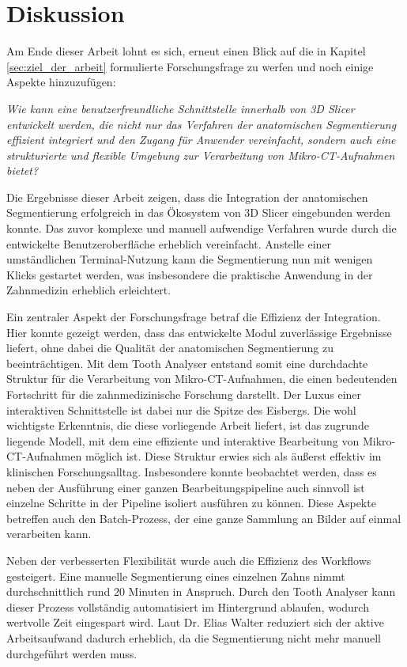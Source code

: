 \chapter{Diskussion}
\label{chap:diskussion} Am Ende dieser Arbeit lohnt es sich, erneut einen Blick
auf die in Kapitel \ref{sec:ziel_der_arbeit} formulierte Forschungsfrage zu
werfen und noch einige Aspekte hinzuzufügen:

\begin{center}
	\textit{Wie kann eine benutzerfreundliche Schnittstelle innerhalb von 3D
	Slicer entwickelt werden, die nicht nur das Verfahren der anatomischen Segmentierung
	effizient integriert und den Zugang für Anwender vereinfacht, sondern auch
	eine strukturierte und flexible Umgebung zur Verarbeitung von Mikro-\ac{CT}-Aufnahmen
	bietet?}
\end{center}

Die Ergebnisse dieser Arbeit zeigen, dass die Integration der anatomischen
Segmentierung erfolgreich in das Ökosystem von 3D Slicer eingebunden werden
konnte. Das zuvor komplexe und manuell aufwendige Verfahren wurde durch die entwickelte
Benutzeroberfläche erheblich vereinfacht. Anstelle einer umständlichen Terminal-Nutzung
kann die Segmentierung nun mit wenigen Klicks gestartet werden, was insbesondere
die praktische Anwendung in der Zahnmedizin erheblich erleichtert.

Ein zentraler Aspekt der Forschungsfrage betraf die Effizienz der Integration.
Hier konnte gezeigt werden, dass das entwickelte Modul zuverlässige Ergebnisse liefert,
ohne dabei die Qualität der anatomischen Segmentierung zu beeinträchtigen. Mit dem
Tooth Analyser entstand somit eine durchdachte Struktur für die Verarbeitung von
Mikro-\ac{CT}-Aufnahmen, die einen bedeutenden Fortschritt für die zahnmedizinische
Forschung darstellt. Der Luxus einer interaktiven Schnittstelle ist dabei nur
die Spitze des Eisbergs. Die wohl wichtigste Erkenntnis, die diese vorliegende
Arbeit liefert, ist das zugrunde liegende Modell, mit dem eine effiziente und
interaktive Bearbeitung von Mikro-CT-Aufnahmen möglich ist. Diese Struktur erwies
sich als äußerst effektiv im klinischen Forschungsalltag. Insbesondere konnte
beobachtet werden, dass es neben der Ausführung einer ganzen Bearbeitungspipeline
auch sinnvoll ist einzelne Schritte in der Pipeline isoliert ausführen zu können.
Diese Aspekte betreffen auch den Batch-Prozess, der eine ganze Sammlung an Bilder
auf einmal verarbeiten kann.

Neben der verbesserten Flexibilität wurde auch die Effizienz des Workflows gesteigert.
Eine manuelle Segmentierung eines einzelnen Zahns nimmt durchschnittlich rund 20
Minuten in Anspruch. Durch den Tooth Analyser kann dieser Prozess vollständig automatisiert
im Hintergrund ablaufen, wodurch wertvolle Zeit eingespart wird. Laut Dr. Elias
Walter reduziert sich der aktive Arbeitsaufwand dadurch erheblich, da die Segmentierung
nicht mehr manuell durchgeführt werden muss.

